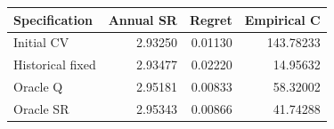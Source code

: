 \begin{tabular}{lrrr}
\toprule
Specification & Annual SR & Regret & Empirical C \\
\midrule
Initial CV & 2.93250 & 0.01130 & 143.78233 \\
Historical fixed & 2.93477 & 0.02220 & 14.95632 \\
Oracle Q & 2.95181 & 0.00833 & 58.32002 \\
Oracle SR & 2.95343 & 0.00866 & 41.74288 \\
\bottomrule
\end{tabular}
